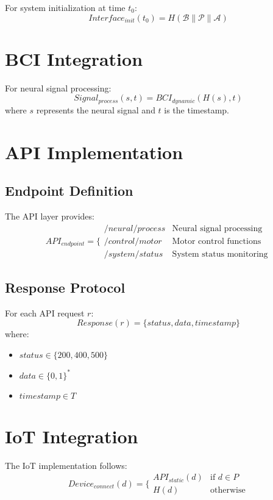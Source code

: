 \documentclass[12pt]{article}
\begin{document}
For system initialization at time $t_0$:
\[Interface_{init}(t_0) = H(\mathcal{B} \parallel \mathcal{P} \parallel \mathcal{A})\]

\section{BCI Integration}
For neural signal processing:
\[Signal_{process}(s, t) = BCI_{dynamic}(H(s), t)\]
where $s$ represents the neural signal and $t$ is the timestamp.

\section{API Implementation}

\subsection{Endpoint Definition}
The API layer provides:
\begin{equation}
API_{endpoint} = \{
\begin{array}{ll}
    /neural/process & \text{Neural signal processing} \\
    /control/motor  & \text{Motor control functions} \\
    /system/status  & \text{System status monitoring}
\end{array}
\end{equation}

\subsection{Response Protocol}
For each API request $r$:
\[Response(r) = \{status, data, timestamp\}\]
where:
\begin{itemize}
    \item $status \in \{200, 400, 500\}$
    \item $data \in \{0,1\}^*$
    \item $timestamp \in T$
\end{itemize}

\section{IoT Integration}
The IoT implementation follows:
\begin{equation}
Device_{connect}(d) = \{
\begin{array}{ll}
    API_{static}(d) & \text{if } d \in P \\
    H(d) & \text{otherwise}
\end{array}
\end{equation}
\end{document}
